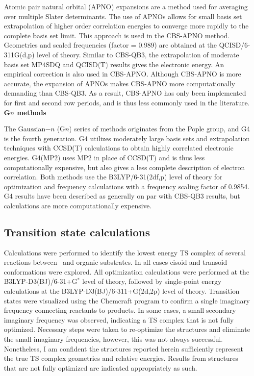 Atomic pair natural orbital (APNO) expansions are a method used for averaging over multiple Slater determinants. The use of APNOs allows for small basis set extrapolation of higher order correlation energies to converge more rapidly to the complete basis set limit. This approach is used in the CBS-APNO method.\cite{Ochterski1996} Geometries and scaled frequencies (factor = 0.989) are obtained at the QCISD/6-311G(d,p) level of theory. Similar to CBS-QB3, the extrapolation of moderate basis set MP4SDQ and QCISD(T) results gives the electronic energy. An empirical correction is also used in CBS-APNO. Although CBS-APNO is more accurate, the expansion of APNOs makes CBS-APNO more computationally demanding than CBS-QB3. As a result, CBS-APNO has only been implemented for first and second row periods, and is thus less commonly used in the literature.
\\

\noindent \textbf{G$n$ methods}

The Gaussian$-n$ (G$n$) series of methods originates from the Pople group,\cite{Pople1989} and G4 is the fourth generation. G4 utilizes moderately large basis sets and extrapolation techniques with CCSD(T) calculations to obtain highly correlated electronic energies. G4(MP2) uses MP2 in place of CCSD(T) and is thus less computationally expensive, but also gives a less complete description of electron correlation. Both methods use the B3LYP/6-31(2df,p) level of theory for optimization and frequency calculations with a frequency scaling factor of 0.9854. G4 results have been described as generally on par with CBS-QB3 results,\cite{Somers2015, Simmie2015} but calculations are more computationally expensive.

\subsection{Transition state calculations}

Calculations were performed to identify the lowest energy TS complex of several reactions between \cumo\ and organic substrates. In all cases cisoid and transoid conformations were explored. All optimization calculations were performed at the B3LYP-D3(BJ)/6-31+G$^*$ level of theory, followed by single-point energy calculations at the B3LYP-D3(BJ)/6-311+G(2d,2p) level of theory. Transition states were visualized using the Chemcraft program\cite{ccraft} to confirm a single imaginary frequency connecting reactants to products. In some cases, a small secondary imaginary frequency was observed, indicating a TS complex that is not fully optimized. Necessary steps were taken to re-optimize the structures and eliminate the small imaginary frequencies, however, this was not always successful. Nonetheless, I am confident the structures reported herein sufficiently represent the true TS complex geometries and relative energies. Results from structures that are not fully optimized are indicated appropriately as such.

